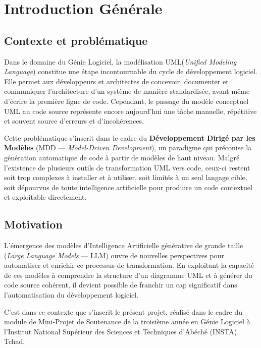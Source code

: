\chapter*{Introduction Générale}

\section*{Contexte et problématique}

Dans le domaine du Génie Logiciel, la modélisation UML\fnUML (\textit{Unified Modeling Language}) constitue une étape incontournable du cycle de développement logiciel. Elle permet aux développeurs et architectes de concevoir, documenter et communiquer l'architecture d'un système de manière standardisée, avant même d'écrire la première ligne de code. Cependant, le passage du modèle conceptuel UML au code source représente encore aujourd'hui une tâche manuelle, répétitive et souvent source d'erreurs et d'incohérences.

Cette problématique s'inscrit dans le cadre du \textbf{Développement Dirigé par les Modèles} (MDD — \textit{Model-Driven Development}), un paradigme qui préconise la génération automatique de code à partir de modèles de haut niveau. Malgré l'existence de plusieurs outils de transformation UML vers code, ceux-ci restent soit trop complexes à installer et à utiliser, soit limités à un seul langage cible, soit dépourvus de toute intelligence artificielle pour produire un code contextuel et exploitable directement.

\section*{Motivation}

L'émergence des modèles d'Intelligence Artificielle générative de grande taille (\textit{Large Language Models} — LLM) ouvre de nouvelles perspectives pour automatiser et enrichir ce processus de transformation. En exploitant la capacité de ces modèles à comprendre la structure d'un diagramme UML et à générer du code source cohérent, il devient possible de franchir un cap significatif dans l'automatisation du développement logiciel.

C'est dans ce contexte que s'inscrit le présent projet, réalisé dans le cadre du module de Mini-Projet de Soutenance de la troisième année en Génie Logiciel à l'Institut National Supérieur des Sciences et Techniques d'Abéché (INSTA), Tchad.

